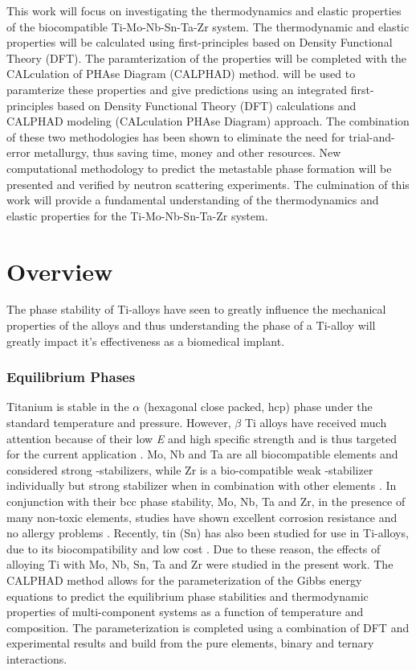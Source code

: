 This work will focus on investigating the thermodynamics and elastic properties of the biocompatible Ti-Mo-Nb-Sn-Ta-Zr system. The thermodynamic and elastic properties will be calculated using first-principles based on Density Functional Theory (DFT). The paramterization of the properties will be completed with the CALculation of PHAse Diagram (CALPHAD) method.  will be used to paramterize these properties and give predictions  using an integrated first-principles based on Density Functional Theory (DFT) calculations and CALPHAD modeling (CALculation PHAse Diagram) approach. The combination of these two methodologies has been shown to eliminate the need for trial-and-error metallurgy, thus saving time, money and other resources. New computational methodology to predict the metastable phase formation will be presented and verified by neutron scattering experiments. The culmination of this work will provide a fundamental understanding of the thermodynamics and elastic properties for the Ti-Mo-Nb-Sn-Ta-Zr system. 


\section{Overview}

The phase stability of Ti-alloys have seen to greatly influence the mechanical properties of the alloys and thus understanding the phase of a Ti-alloy will greatly impact it's effectiveness as a biomedical implant.


\subsubsection{Equilibrium Phases}

Titanium is stable in the $\alpha$ (hexagonal close packed, hcp) phase under the standard temperature and pressure. However, $\beta$ Ti alloys have received much attention because of their low \textit{E} and high specific strength and is thus targeted for the current application \cite{Mei2011,Brailovski2011b}. Mo, Nb and Ta are all biocompatible elements and considered strong -stabilizers, while Zr is a bio-compatible weak -stabilizer individually but strong stabilizer when in combination with other elements \cite{Long1998a}.  In conjunction with their bcc phase stability, Mo, Nb, Ta and Zr, in the presence of many non-toxic elements, studies have shown excellent corrosion resistance and no allergy problems \cite{Tane2008a}. Recently, tin (Sn) has also been studied for use in Ti-alloys,  due to its biocompatibility and low cost \cite{Niinomi2012}. Due to these reason, the effects of alloying Ti with Mo, Nb, Sn, Ta and Zr were studied in the present work. The CALPHAD method allows for the parameterization of the Gibbs energy equations to predict the equilibrium phase stabilities and thermodynamic properties of multi-component systems as a function of temperature and composition. The parameterization is completed using a combination of DFT and experimental results and build from the pure elements, binary and ternary interactions. 

